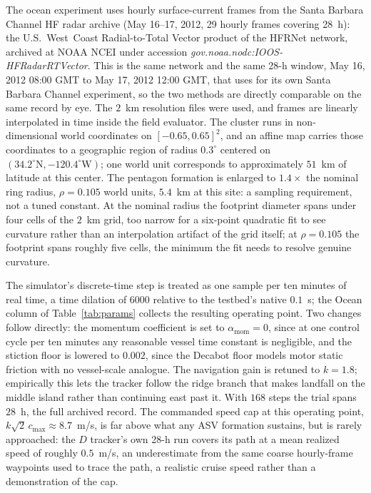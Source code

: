 \documentclass[lettersize,journal]{IEEEtran}
\begin{document}
The ocean experiment uses hourly surface-current frames from the
Santa Barbara Channel HF radar archive (May 16--17, 2012, 29 hourly
frames covering 28~h): the U.S.~West~Coast Radial-to-Total Vector
product of the HFRNet network, archived at NOAA NCEI under accession
\textit{gov.noaa.nodc:IOOS-HFRadarRTVector}. This is the same network
and the same 28-h window, May 16, 2012 08:00 GMT to May 17, 2012 12:00
GMT, that \cite{9} uses for its own Santa Barbara Channel
experiment, so the two methods are directly comparable on the same
record by eye. The $2$~km resolution
files were used, and frames are linearly interpolated in time inside
the field evaluator.
The cluster runs in
non-dimensional world coordinates on $[-0.65, 0.65]^2$, and an affine
map carries those coordinates to a geographic region of radius
$0.3^{\circ}$ centered on $(34.2^{\circ}\mathrm{N},
-120.4^{\circ}\mathrm{W})$; one
world unit corresponds to approximately $51$~km of latitude at this
center. The pentagon formation is enlarged to $1.4\times$ the nominal
ring radius, $\rho = 0.105$ world units, $5.4$~km at this site: a
sampling requirement, not a tuned constant. At the nominal radius the
footprint diameter spans under four cells of the $2$~km grid, too
narrow for a six-point quadratic fit to see curvature rather than an
interpolation artifact of the grid itself; at $\rho = 0.105$ the
footprint spans roughly five cells, the minimum the fit needs to
resolve genuine curvature.

The simulator's discrete-time step is treated as one sample per ten
minutes of real time, a time dilation of 6000 relative to the testbed's
native $0.1$~s; the Ocean column of Table~\ref{tab:params} collects
the resulting operating point. Two changes follow directly: the
momentum coefficient is set to $\alpha_{\text{mom}} = 0$, since at one
control cycle per ten minutes any reasonable vessel time constant is
negligible, and the stiction floor is lowered to $0.002$, since the
Decabot floor models motor static friction with no vessel-scale
analogue. The navigation gain is retuned to $k = 1.8$; empirically this
lets the tracker follow the ridge branch that makes landfall on the
middle island rather than continuing east past it. With $168$ steps the
trial spans $28$~h, the full archived record. The commanded speed cap
at this operating point, $k\sqrt{2}\,c_{\max} \approx 8.7$~m/s, is far
above what any ASV formation sustains, but is rarely approached: the
$D$ tracker's own 28-h run covers its
path at a mean realized speed of roughly $0.5$~m/s, an underestimate
from the same coarse hourly-frame waypoints used to trace the path, a
realistic cruise speed rather than a demonstration of the cap.
\end{document}
